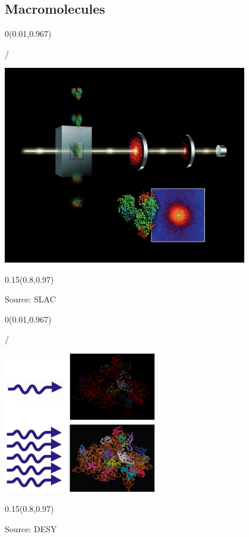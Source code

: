 \documentclass{beamer}
\makeatletter
\newcommand{\framenumber}{
\begin{textblock}{0}(0.01,0.967)
\begin{scriptsize}
{\color{gray}\insertframenumber/\inserttotalframenumber}
\end{scriptsize}
\end{textblock}
}
\makeatother
\begin{document}
\subsection{Macromolecules}
\begin{frame}{}\framenumber
\begin{center}
\includegraphics[width=0.8\textwidth]{figures/appendix/macromol_imag}
\end{center}
\begin{textblock}{0.15}(0.8,0.97)
\begin{tiny}Source: SLAC\end{tiny}
\end{textblock}

\end{frame}
\begin{frame}{}\framenumber
\begin{center}
\includegraphics[width=0.5\textwidth]{figures/appendix/macromol_brigth}
\end{center}
\begin{textblock}{0.15}(0.8,0.97)
\begin{tiny}Source: DESY\end{tiny}
\end{textblock}
\end{frame}
\end{document}
